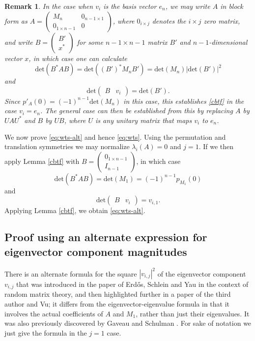 \documentclass[12pt]{amsart}
\newtheorem{remark}[lemma]{Remark}
\begin{document}
\begin{remark}  In the case when $v_i$ is the basis vector $e_n$, we may write $A$ in block form as $A = \begin{pmatrix} M_n & 0_{n-1 \times 1} \\ 0_{1 \times n-1} & 0 \end{pmatrix}$, where $0_{i \times j}$ denotes the $i \times j$ zero matrix, and write $B = \begin{pmatrix} B' \\ x^* \end{pmatrix}$ for some $n-1 \times n-1$ matrix $B'$ and $n-1$-dimensional vector $x$, in which case one can calculate
$$ \mathrm{det}(B^* A B) = \mathrm{det}( (B')^* M_n B' ) = \mathrm{det}(M_n) |\mathrm{det}(B')|^2$$
and
$$ \mathrm{det} \begin{pmatrix} B & v_i \end{pmatrix} = \mathrm{det}(B').$$
Since $p'_A(0) = (-1)^{n-1} \mathrm{det}(M_n)$ in this case, this establishes \eqref{cbtf} in the case $v_i=e_n$.  The general case can then be established from this by replacing $A$ by $UAU^*$ and $B$ by $UB$, where $U$ is any unitary matrix that maps $v_i$ to $e_n$.
\end{remark}

We now prove \eqref{eq:wts-alt} and hence \eqref{eq:wts}.  Using the permutation and translation symmetries we may normalize $\lambda_i(A)=0$ and $j=1$.  If we then apply Lemma \ref{cbtf} with $B = \begin{pmatrix} 0_{1 \times n-1} \\ I_{n-1} \end{pmatrix}$, in which case
$$ \mathrm{det}( B^* A B ) = \mathrm{det}(M_1) = (-1)^{n-1} p_{M_1}(0)$$
and
$$ \mathrm{det} \begin{pmatrix} B & v_i \end{pmatrix} = v_{i,1}.$$
Applying Lemma \ref{cbtf}, we obtain \eqref{eq:wts-alt}.

\subsection{Proof using an alternate expression for eigenvector component magnitudes}

There is an alternate formula for the square $|v_{i,j}|^2$ of the eigenvector component $v_{i,j}$ that was introduced in the paper \cite[(5.8)]{ESY} of Erd\H{o}s, Schlein and Yau in the context of random matrix theory, and then highlighted further in a paper \cite[Lemma 41]{tao2011} of the third author and Vu; it differs from the eigenvector-eigenvalue formula in that it involves the actual coefficients of $A$ and $M_1$, rather than just their eigenvalues.  It was also previously discovered by Gaveau and Schulman \cite[(2.6)]{gaveau}. For sake of notation we just give the formula in the $j=1$ case.
\end{document}
